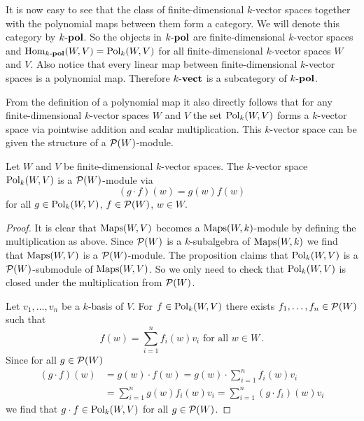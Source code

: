 It is now easy to see that the class of finite-dimensional $k$-vector spaces together with the polynomial maps between them form a category.
We will denote this category by $k\text{-}\mathbf{pol}$.
So the objects in $k\text{-}\mathbf{pol}$ are finite-dimensional $k$-vector spaces and $\operatorname{Hom}_{k\text{-}\mathbf{pol}}(W,V) = \operatorname{Pol}_k(W,V)$ for all finite-dimensional $k$-vector spaces $W$ and $V$.
Also notice that every linear map between finite-dimensional $k$-vector spaces is a polynomial map.
Therefore $k\text{-}\mathbf{vect}$ is a subcategory of $k\text{-}\mathbf{pol}$.

From the definition of a polynomial map it also directly follows that for any finite-dimensional $k$-vector spaces $W$ and $V$ the set $\operatorname{Pol}_k(W,V)$ forms a $k$-vector space via pointwise addition and scalar multiplication.
This $k$-vector space can be given the structure of a $\mathcal{P}(W)$-module.

\begin{prop}
  Let $W$ and $V$ be finite-dimensional $k$-vector spaces.
  The $k$-vector space $\operatorname{Pol}_k(W,V)$ is a $\mathcal{P}(W)$-module via
  \[
      (g \cdot f)(w)
    = g(w) f(w)
  \]
  for all $g \in \operatorname{Pol}_k(W,V)$,
  $f \in \mathcal{P}(W)$,
  $w \in W$.
\end{prop}
\begin{proof}
  It is clear that $\operatorname{Maps}(W,V)$ becomes a $\operatorname{Maps}(W,k)$-module by defining the multiplication as above.
  Since $\mathcal{P}(W)$ is a $k$-subalgebra of $\operatorname{Maps}(W,k)$ we find that $\operatorname{Maps}(W,V)$ is a $\mathcal{P}(W)$-module.
  The proposition claims that $\operatorname{Pol}_k(W,V)$ is a $\mathcal{P}(W)$-submodule of $\operatorname{Maps}(W,V)$.
  So we only need to check that $\operatorname{Pol}_k(W,V)$ is closed under the multiplication from $\mathcal{P}(W)$.
  
  Let $v_1, \dotsc, v_n$ be a $k$-basis of $V$.
  For $f \in \operatorname{Pol}_k(W,V)$ there exists $f_1, \dotsc, f_n \in \mathcal{P}(W)$ such that
  \[
      f(w)
    = \sum_{i=1}^n f_i(w) v_i
    \text{ for all }
    w \in W \,.
  \]
  Since for all $g \in \mathcal{P}(W)$
  \begin{align*}
        (g \cdot f)(w)
    &=  g(w) \cdot f(w)
     =  g(w) \cdot \sum_{i=1}^n f_i(w) v_i \\
    &=  \sum_{i=1}^n g(w) f_i(w) v_i
     =  \sum_{i=1}^n (g \cdot f_i)(w) v_i
  \end{align*}
  we find that $g \cdot f \in \operatorname{Pol}_k(W,V)$ for all $g \in \mathcal{P}(W)$.
\end{proof}



